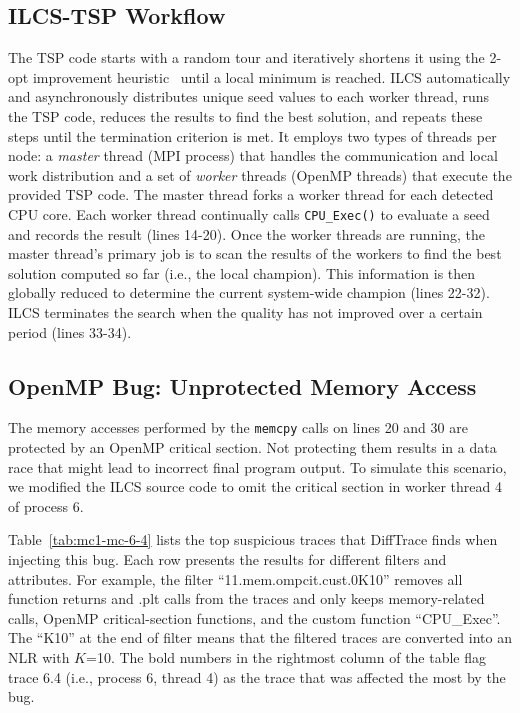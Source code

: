 \subsection{ILCS-TSP Workflow}

The TSP code starts with a random tour and iteratively shortens it using the 2-opt improvement heuristic~\cite{2-opt} until a local minimum is reached. ILCS automatically and asynchronously distributes unique seed values to each worker thread, runs the TSP code, reduces the results to find the best solution, and repeats these steps until the termination criterion is met. It employs two types of threads per node: a \textit{master} thread (MPI process) that handles the communication and local work distribution and a set of \textit{worker} threads (OpenMP threads) that execute the provided TSP code. The master thread forks a worker thread for each detected CPU core.
%
Each worker thread continually calls
\texttt{CPU\_Exec()} to evaluate a seed and records the result (lines 14-20).
%
Once the worker threads are running, the master thread's primary job is to scan the results of the workers to find the best solution computed so far (i.e., the local champion). This information is then globally reduced to determine the current system-wide champion (lines 22-32).
%
ILCS terminates the search when the quality has not improved over a certain period (lines 33-34).



\subsection{OpenMP Bug: Unprotected Memory Access}

The memory accesses performed by the \texttt{memcpy} calls on lines 20 and 30 are protected by an OpenMP critical section.
%
Not protecting them results in a data race that might lead to incorrect final program output.
%
To simulate this scenario, we modified the ILCS source code to omit the critical section in worker thread 4 of process 6.

Table~\ref{tab:mc1-mc-6-4} lists the top suspicious traces that DiffTrace finds when injecting this bug.
%
Each row presents the results for different filters and attributes.
%
For example, the filter ``11.mem.ompcit.cust.0K10'' removes all function returns and .plt calls from the traces and only keeps memory-related calls, OpenMP critical-section functions, and the custom function ``CPU\_Exec''.
%
The ``K10'' at the end of filter means that the filtered traces are converted into an NLR with $K$=10.
%
%
The bold numbers in the rightmost column of the table flag trace 6.4 (i.e., process 6, thread 4) as the trace that was affected the most by the bug.
%

